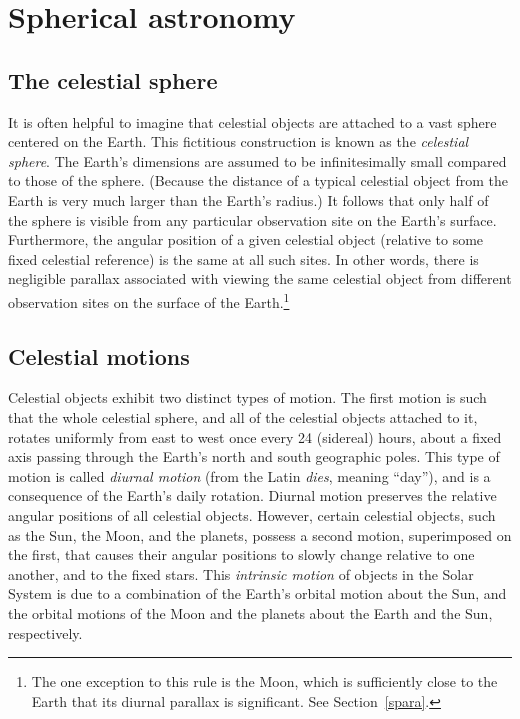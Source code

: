 \chapter{Spherical astronomy}

\section{The celestial sphere}
It is often helpful to imagine that celestial objects are attached to a vast sphere centered on the
Earth. This fictitious construction is known as the  {\em celestial sphere}. The Earth's dimensions are assumed 
to be infinitesimally small compared to those  of the sphere. (Because the distance of a typical celestial object from 
the Earth is very much larger than the Earth's radius.)  It follows that only  half of the sphere  is visible from
any particular observation site on the Earth's surface. Furthermore, the angular position of a given celestial object (relative to some fixed celestial reference) is the 
same at all such sites. In other words, there is negligible  parallax associated
with viewing the same celestial object from different observation sites on the surface of the Earth.\footnote{
 The one exception to this rule is the Moon, which is sufficiently close to the Earth
 that its diurnal parallax is significant. See Section~\ref{spara}.}

\section{Celestial motions}
Celestial objects exhibit  two  distinct types of motion. The first motion is such that the whole celestial sphere, and all of the
celestial objects attached to it, rotates
uniformly from east to west once every 24 (sidereal) hours, about a fixed axis passing through the Earth's north and south geographic  poles. This type of motion is called  {\em diurnal motion}\/ (from the Latin {\em dies}, meaning ``day''), and is a consequence of the Earth's daily  rotation. Diurnal motion preserves the relative angular positions of all celestial objects. However, certain
celestial objects, such as the Sun, the Moon, and the planets, possess a second motion, superimposed on the
first, that causes their angular positions to slowly change relative to one another, and to the fixed stars. This  {\em intrinsic
motion}\/  of objects in the Solar System is due to a combination of the Earth's orbital motion about the Sun, and the orbital motions of the Moon and the planets about the Earth and the Sun, respectively.

